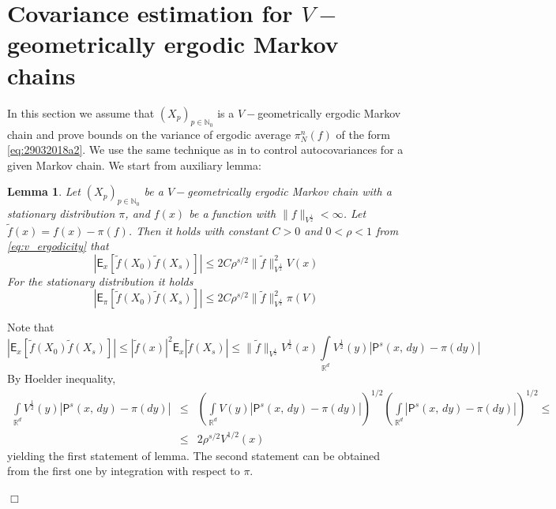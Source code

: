 \documentclass[bj]{imsart}
\def\nset{\mathbb{N}}
\def\rset{\mathbb{R}}
\def\rset{\mathbb{R}}
\newcommand{\proofendsign}{$\Box$}
\newtheorem{lem}[thm]{Lemma}
\newenvironment{proof}{{\noindent \bf Proof }}
 {{\hspace*{\fill}\proofendsign\par\bigskip}}
\begin{document}
\section{Covariance estimation for $V-$geometrically ergodic Markov chains}\label{sec:appendix_moments}
In this section we assume that $(X_p)_{p \in \nset_0}$ is a $V-$geometrically ergodic Markov chain and prove bounds on the variance of ergodic average $\pi_N^n(f)$ of the form \eqref{eq:29032018a2}. We use the same technique as in \cite{belomestny2019esvm} to control autocovariances for a given Markov chain. We start from auxiliary lemma:
\begin{lem}
\label{lem:fp_covariance}
Let $(X_p)_{p \in \nset_0}$ be a $V-$geometrically ergodic Markov chain with a stationary distribution $\pi$, and $f(x)$ be a function with $\|f\|_{V^{\frac{1}{2}}} < \infty$. Let $\tilde{f}(x) = f(x) - \pi(f)$. Then it holds with constant $C > 0$ and $0 < \rho <1$ from \eqref{eq:v_ergodicity} that
\begin{equation}
\label{eq:fp_cov}
|\mathsf{E}_x[\tilde{f}(X_0)\tilde{f}(X_s)]| \leq 2C\rho^{s/2}\|\tilde{f}\|^2_{V^{\frac{1}{2}}}V(x)
\end{equation}
For the stationary distribution it holds
\begin{equation}
\label{eq:fp_cov_stationary}
|\mathsf{E}_{\pi}[\tilde{f}(X_0)\tilde{f}(X_s)]| \leq 2C\rho^{s/2}\|\tilde{f}\|^2_{V^{\frac{1}{2}}}\pi(V)
\end{equation}
\end{lem}
\begin{proof}
Note that
\[
|\mathsf{E}_x[\tilde{f}(X_0)\tilde{f}(X_s)]| \leq |\tilde{f}(x)|^2 \mathsf{E}_x|\tilde{f}(X_s)| \leq \|\tilde{f}\|_{V^{\frac{1}{2}}}V^{\frac{1}{2}}(x)\int\limits_{\rset^d} V^{\frac{1}{2}}(y)|\mathsf{P}^{s}(x,\,dy)-\pi(dy)|
\]
By Hoelder inequality,
\begin{eqnarray*}
\int\limits_{\rset^d} V^{\frac{1}{2}}(y)|\mathsf{P}^{s}(x,\,dy)-\pi(dy)| & \leq & \left(\int\limits_{\rset^d} V(y)|\mathsf{P}^{s}(x,\,dy)-\pi(dy)|\right)^{1/2}\left(\int\limits_{\rset^d}|\mathsf{P}^{s}(x,\,dy)-\pi(dy)|\right)^{1/2} \leq \\
& \leq & 2\rho^{s/2}V^{1/2}(x)
\end{eqnarray*}
yielding the first statement of lemma. The second statement can be obtained from the first one by integration with respect to $\pi$.
\end{proof}
\end{document}

